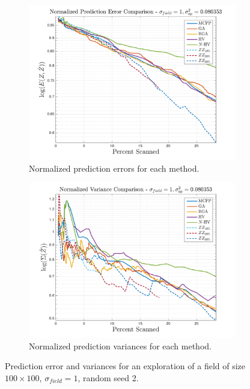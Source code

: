 \begin{figure}[htb!]
    \centering
    \begin{subfigure}[t]{0.5\textwidth}
        \centering
        \includegraphics[width=\linewidth]{figures/results/normalized_errors_30p_100x100_sf_1_seed_2_app_50.png}
        \ssp
        \captionsetup{skip=0.20\baselineskip,size=footnotesize}
        \caption{Normalized prediction errors for each method.}
    \end{subfigure}%
    \begin{subfigure}[t]{0.5\textwidth}
        \centering
        \includegraphics[width=\linewidth]{figures/results/normalized_variances_30p_100x100_sf_1_seed_2_app_50.png}
        \ssp
        \captionsetup{skip=0.20\baselineskip,size=footnotesize}
        \caption{Normalized prediction variances for each method.}
    \end{subfigure}%
    \ssp
    \captionsetup{skip=0.20\baselineskip}
    \caption{Prediction error and variances for an exploration of a field of size $100 \times 100$, $\sigma_{field} = 1$, random seed 2.}
    \label{fig:errvar1}
\end{figure}

